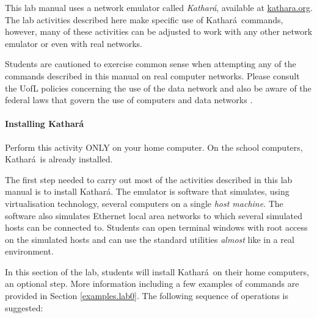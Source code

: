 \documentclass[12pt]{book}
\newcommand{\kathara}{Kathar\'a}
\begin{document}
This lab manual uses a network emulator called \emph{\kathara},
available at \url{kathara.org}. The lab activities described here make
specific use of \kathara\ commands, however, many of these
activities can be adjusted to work with any other network emulator or
even with real networks. 

\begin{tcolorbox}[title=Lab safety note]
  Students are cautioned to exercise common sense when attempting any
  of the commands described in this manual on real computer
  networks. Please consult the UofL policies concerning the use of the
  data network \cite{its-policies} and also be aware of the federal
  laws that govern the use of computers and data networks
  \cite{law-canada,law-us}. 
\end{tcolorbox}

\paragraph{Installing \kathara}

Perform this activity ONLY on your home computer. On the school
computers, \kathara\ is already installed.

The first step needed to carry out most of the activities described in
this lab manual is to install \kathara. The emulator is
software that simulates, using virtualisation technology, several
computers on a single \emph{host machine}. The software also simulates
Ethernet local area networks to which several simulated hosts can be
connected to. Students can open terminal windows with root access on
the simulated hosts and can use the standard utilities \emph{almost}
like in a real environment.

In this section of the lab, students will install \kathara\ on their
home computers, an optional step. More information
including a few examples of commands are provided in Section
\ref{examples.lab0}. The following sequence of operations is
suggested: 
\end{document}
